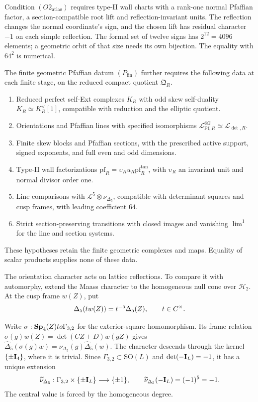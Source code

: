 Condition
\((O2_{\mathrm{atlas}})\) requires type-II wall charts with a
rank-one normal Pfaffian factor, a section-compatible root lift
and reflection-invariant units. The reflection changes the normal
coordinate's sign, and the chosen lift has residual character
\(-1\) on each simple reflection. The formal set of twelve signs
has \(2^{12}=4096\) elements; a geometric orbit of that size needs
its own bijection. The equality with \(64^2\) is numerical.

The finite geometric Pfaffian datum \((P_{\mathrm{fin}})\) further
requires the following data at each finite stage, on the reduced
compact quotient \(\mathfrak Q_R\).
\begin{enumerate}
\item Reduced perfect self-Ext complexes \(K_R\) with odd skew
self-duality \(K_R\simeq K_R^\vee[1]\), compatible with reduction
and the elliptic quotient.
\item Orientations and Pfaffian lines with specified isomorphisms
\(\mathcal L_{\mathrm{Pf},R}^{\otimes2}\simeq\mathcal L_{\det,R}\).
\item Finite skew blocks and Pfaffian sections, with the prescribed
active support, signed exponents, and full even and odd dimensions.
\item Type-II wall factorizations
\(\mathrm{pf}_R=\upsilon_Ru_R\mathrm{pf}^{\mathrm{tan}}_R\),
with \(\upsilon_R\) an invariant unit and normal divisor order one.
\item Line comparisons with \(\mathcal L^5\otimes\nu_{\Delta_5}\),
compatible with determinant squares and cusp frames, with leading
coefficient \(64\).
\item Strict section-preserving transitions with closed images and
vanishing \(\lim^1\) for the line and section systems.
\end{enumerate}
These hypotheses retain the finite geometric complexes and maps.
Equality of scalar products supplies none of these data.

The orientation character acts on lattice reflections. To compare
it with automorphy, extend the Maass character to the homogeneous
null cone over \(\mathcal H_2\). At the cusp frame \(w(Z)\), put
\[
 \Delta_5(tw(Z))=t^{-5}\Delta_5(Z),\qquad t\in C^\times.
\]

Write \(\sigma:\mathbf{Sp}_4(Z)to\Gamma_{3,2}\) for the exterior-square
homomorphism. Its frame relation
\(\sigma(g)w(Z)=\det(CZ+D)w(gZ)\) gives
\(\widehat\Delta_5(\sigma(g)w)=
\nu_{\Delta_5}(g)\widehat\Delta_5(w)\).
The character descends through the kernel \(\{\pm\mathbf{I}_4\}\),
where it is trivial. Since \(\Gamma_{3,2}\subset\mathrm{SO}(L)\)
and \(\det(-\mathbf{I}_L)=-1\), it has a unique extension
\[
 \widetilde\nu_{\Delta_5}:
 \Gamma_{3,2}\times\{\pm\mathbf{I}_L\}\longrightarrow\{\pm1\},
 \qquad \widetilde\nu_{\Delta_5}(-\mathbf{I}_L)=(-1)^5=-1.
\]
The central value is forced by the homogeneous degree.

